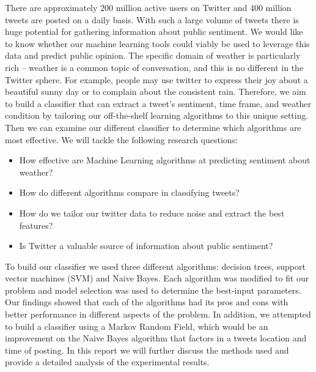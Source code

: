 	There are approximately 200 million active users on Twitter and 400 million tweets are posted on a daily basis. With such a large volume of tweets there is huge potential for gathering information about public sentiment. We would like to know whether our machine learning tools could viably be used to leverage this data and predict public opinion. The specific domain of weather is particularly rich – weather is a common topic of conversation, and this is no different in the Twitter sphere. For example, people may use twitter to express their joy about a beautiful sunny day or to complain about the consistent rain. Therefore, we aim to build a classifier that can extract a tweet's sentiment, time frame, and weather condition by tailoring our off-the-shelf learning algorithms to this unique setting. Then we can examine our different classifier to determine which algorithms are most effective. We will tackle the following research questions: 

\begin{itemize}
	\item How effective are Machine Learning algorithms at predicting sentiment about weather?
	\item How do different algorithms compare in classifying tweets?
	\item How do we tailor our twitter data to reduce noise and extract the best features?
	\item Is Twitter a valuable source of information about public sentiment?
\end{itemize}

            To build our classifier we used three different algorithms: decision trees, support vector machines (SVM) and Naive Bayes. Each algorithm was modified to fit our problem and model selection was used to determine the best-input parameters. Our findings showed that each of the algorithms had its pros and cons with better performance in different aspects of the problem. In addition, we attempted to build a classifier using a Markov Random Field, which would be an improvement on the Naive Bayes algorithm that factors in a tweets location and time of posting. In this report we will further discuss the methods used and provide a detailed analysis of the experimental results.   